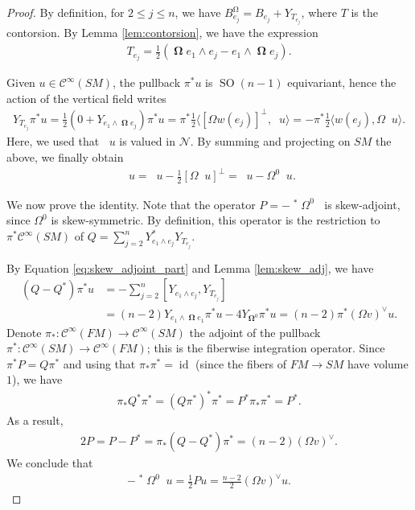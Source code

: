 \documentclass[12pt]{amsart}
\numberwithin{numbering}{section}
\theoremstyle{plain}
\theoremstyle{definition}
\theoremstyle{remark}
\numberwithin{equation}{section}
\DeclareMathOperator{\identity}{id}
\DeclareMathOperator{\SO}{SO}
\DeclareMathOperator{\nv}{\nabla_{\mathbb{V}}}
\DeclareMathOperator{\nh}{\nabla_{\mathbb{H}}}
\DeclareMathOperator{\nhs}{\nabla_{\mathbb{H}^{\mg}}}
\DeclareMathOperator{\oo}{\mathbf{\Omega}}
\DeclareMathOperator{\mg}{\Omega}
\begin{document}
\begin{proof}
By definition, for $2 \leq j \leq n$, we have $B^{\mg}_{e_j} = B_{e_j} + Y_{T_{e_j}}$, where $T$ is the contorsion. By Lemma \ref{lem:contorsion}, we have the expression 
\begin{align*}
T_{e_j} = \frac{1}{2} (\oo e_1 \wedge e_j - e_1 \wedge \oo e_j).
\end{align*}

Given $u \in \mathcal{C}^\infty(SM)$, the pullback $\pi^* u$ is $\SO(n-1)$ equivariant, hence the action of the vertical field writes 
\begin{align*}
Y_{T_{e_j}} \pi^* u 
= \frac{1}{2} (0 + Y_{e_1 \wedge \oo e_j}) \pi^* u = \pi^* \frac{1}{2} \langle [\Omega w(e_j)]^\perp, \nv u \rangle = - \pi^* \frac{1}{2} \langle w(e_j), \Omega \nv u \rangle.
\end{align*}
Here, we used that $\nv u$ is valued in $\mathcal{N}$. By summing and projecting on $SM$ the above, we finally obtain 
\begin{align*}
\nhs u = \nh u - \frac{1}{2} [\Omega \nv u]^\perp = \nh u - \Omega^0 \nv u.
\end{align*}

We now prove the identity. Note that the operator $P = - \nv^* \Omega^0 \nv$ is skew-adjoint, since $\Omega^0$ is skew-symmetric. By definition, this operator is the restriction to $\pi^* \mathcal{C}^\infty(SM)$ of $Q = \sum_{j=2}^n Y_{e_1 \wedge e_j}^* Y_{T_{e_j}}$. 

By Equation \eqref{eq:skew_adjoint_part} and Lemma \ref{lem:skew_adj}, we have 
\begin{align*}
(Q - Q^*) \pi^* u &= - \sum_{j=2}^n [Y_{e_1 \wedge e_j}, Y_{T_{e_j}}] \\ 
&= (n-2) Y_{e_1 \wedge \oo e_1} \pi^* u - 4 Y_{\oo^0} \pi^* u = (n-2) \pi^* (\Omega v)^\vee u.
\end{align*}
Denote $\pi_*: \mathcal{C}^\infty(FM) \to \mathcal{C}^\infty(SM)$ the adjoint of the pullback $\pi^*: \mathcal{C}^\infty(SM) \to \mathcal{C}^\infty(FM)$; this is the fiberwise integration operator. Since $\pi^* P = Q \pi^*$ and using that $\pi_* \pi^* = \identity$ (since the fibers of $FM \to SM$ have volume $1$), we have 
\begin{align*}
\pi_* Q^* \pi^* = (Q \pi^*)^* \pi^* = P^* \pi_* \pi^* = P^*.
\end{align*}
As a result, 
\begin{align*}
2P = P - P^* = \pi_* (Q - Q^*) \pi^* = (n-2) (\Omega v)^\vee.
\end{align*}
We conclude that 
\begin{align*}
- \nv^* \Omega^0 \nv u = \frac{1}{2} P u = \frac{n-2}{2} (\Omega v)^\vee u.
\end{align*}
\end{proof}
\end{document}
